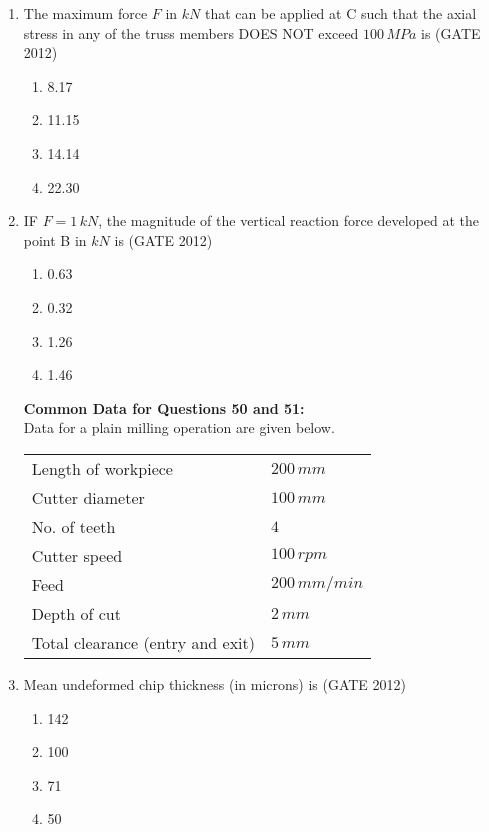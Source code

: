 \documentclass[journal,12pt,onecolumn]{IEEEtran}
\theoremstyle{remark}
\begin{document}
\begin{enumerate}
\item The maximum force $F$ in $kN$ that can be applied at C such that the axial stress in any of the truss members 
DOES NOT exceed $100 \, MPa$ is  
\hfill{(GATE 2012)}

\begin{enumerate}
\item 8.17
\item 11.15
\item 14.14
\item 22.30
\end{enumerate}
\vspace{1cm}

\item IF $F = 1 \, kN$, the magnitude of the vertical reaction force developed at the point B in $kN$ is  
\hfill{(GATE 2012)}

\begin{enumerate}
\item 0.63
\item 0.32
\item 1.26
\item 1.46
\end{enumerate}
\vspace{1cm}

\textbf{Common Data for Questions 50 and 51:   }\\
Data for a plain milling operation are given below.  

\begin{tabular}{ll}
Length of workpiece & $200 \, mm$ \\
Cutter diameter & $100 \, mm$ \\
No. of teeth & $4$ \\
Cutter speed & $100 \, rpm$ \\
Feed & $200 \, mm/min$ \\
Depth of cut & $2 \, mm$ \\
Total clearance (entry and exit) & $5 \, mm$ \\
\end{tabular}

\item Mean undeformed chip thickness (in microns) is  
\hfill{(GATE 2012)}

\begin{enumerate}
\item 142
\item 100
\item 71
\item 50
\end{enumerate}
\vspace{1cm}


\end{enumerate}
\end{document}

